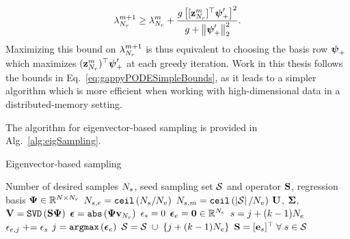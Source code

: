 \begin{enumerate}
	\begin{equation}\label{eq:gappyPODESimpleBounds}
		\lambda_{N_r}^{m+1} \ge \lambda_{N_r}^{m} + \frac{g \left[ [\mathbf{z}_{N_r}^{m}]^\top \boldsymbol{\psi}'_+ \right]^2}{g + \left\Vert \boldsymbol{\psi}'_+ \right\Vert_2^2}.
	\end{equation}
	Maximizing this bound on $\lambda_{N_r}^{m+1}$ is thus equivalent to choosing the basis row $\boldsymbol{\psi}_+$ which maximizes $(\mathbf{z}_{N_r}^{m})^\top \boldsymbol{\psi}'_+$ at each greedy iteration. Work in this thesis follows the bounds in Eq.~\ref{eq:gappyPODESimpleBounds}, as it leads to a simpler algorithm which is more efficient when working with high-dimensional data in a distributed-memory setting.

	The algorithm for eigenvector-based sampling is provided in Alg.~\ref{alg:eigSampling}.

	\begin{algorithm}
		\caption{Eigenvector-based sampling}\label{alg:eigSampling}
		\begin{algorithmic}
			\REQUIRE Number of desired samples $N_s$, seed sampling set $\mathcal{S}$ and operator $\mathbf{S}$, regression basis $\deimBasis \inRTwo{\numDOF}{\numResModes}$
			\STATE $N_{s,e} = \mathtt{ceil}\left(N_s / N_{v} \right)$
			\STATE $N_{s,m} = \mathtt{ceil} \left( \left\vert \mathcal{S} \right\vert / N_{v} \right)$
				\STATE $\leftEvecMat$, $\boldsymbol{\Sigma}$, $\rightEvecMat = \mathtt{SVD}\left(\sampMat \deimBasis \right)$
				\STATE $\errVec = \mathtt{abs} \left( \deimBasis \rightEvecVec{\numResModes} \right)$
				\FORALL{$\sampIdx \in \sampSet$}
					\STATE $\epsilon_{s} = 0$ 
				\ENDFOR
				\STATE $\boldsymbol{\epsilon}_{e} = \mathbf{0} \in \mathbb{R}^{N_{e}}$
						\STATE $s = j + (k - 1) N_{e}$
						\STATE $\epsilon_{e,j} \mathrel{+}= \epsilon_{s}$ 
					\ENDFOR
				\ENDFOR
				\STATE $j = \mathtt{argmax} \left(\boldsymbol{\epsilon}_{e} \right)$
					\STATE $\mathcal{S} = \mathcal{S} \; \cup \; \{j + (k - 1) N_{e}\} $ 
				\ENDFOR
				\STATE $\mathbf{S} = [\mathbf{e}_{s}]^\top \; \forall \; s \in \mathcal{S}$
			\ENDFOR
		\end{algorithmic}
	\end{algorithm}


\end{enumerate}
